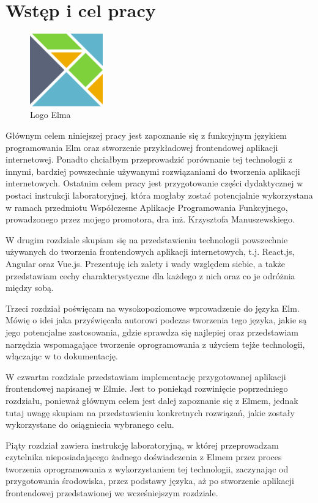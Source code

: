 \documentclass[twoside,a4paper]{report}
\begin{document}
\chapter{Wstęp i cel pracy}
\begin{figure}
    \centering
    \includegraphics[width=0.28\textwidth]{elm_logo.png}
    \caption*{Logo Elma}\label{fig:elm_logo}
\end{figure}
Głównym celem niniejszej pracy jest zapoznanie się z funkcyjnym językiem programowania Elm oraz stworzenie przykładowej frontendowej aplikacji internetowej.
Ponadto chciałbym przeprowadzić porównanie tej technologii z innymi, bardziej powszechnie używanymi rozwiązaniami do tworzenia aplikacji internetowych.
Ostatnim celem pracy jest przygotowanie części dydaktycznej w postaci instrukcji laboratoryjnej, która mogłaby zostać potencjalnie wykorzystana w ramach przedmiotu Współczesne Aplikacje Programowania Funkcyjnego, prowadzonego przez mojego promotora, dra inż. Krzysztofa Manuszewskiego.

W drugim rozdziale skupiam się na przedstawieniu technologii powszechnie używanych do tworzenia frontendowych aplikacji internetowych, t.j. React.js, Angular oraz Vue.js.
Prezentuję ich zalety i wady względem siebie, a także przedstawiam cechy charakterystyczne dla każdego z nich oraz co je odróżnia między sobą.

Trzeci rozdział poświęcam na wysokopoziomowe wprowadzenie do języka Elm.
Mówię o idei jaka przyświęcała autorowi podczas tworzenia tego języka, jakie są jego potencjalne zastosowania, gdzie sprawdza się najlepiej oraz przedstawiam narzędzia wspomagające tworzenie oprogramowania z użyciem tejże technologii, włączając w to dokumentację.

W czwartm rozdziale przedstawiam implementację przygotowanej aplikacji frontendowej napisanej w Elmie.
Jest to poniekąd rozwinięcie poprzedniego rozdziału, ponieważ głównym celem jest dalej zapoznanie się z Elmem, jednak tutaj uwagę skupiam na przedstawieniu konkretnych rozwiązań, jakie zostały wykorzystane do osiągniecia wybranego celu.

Piąty rozdział zawiera instrukcję laboratoryjną, w której przeprowadzam czytelnika nieposiadającego żadnego doświadczenia z Elmem przez proces tworzenia oprogramowania z wykorzystaniem tej technologii, zaczynając od przygotowania środowiska, przez podstawy języka, aż po stworzenie aplikacji frontendowej przedstawionej we wcześniejszym rozdziale.
\end{document}
